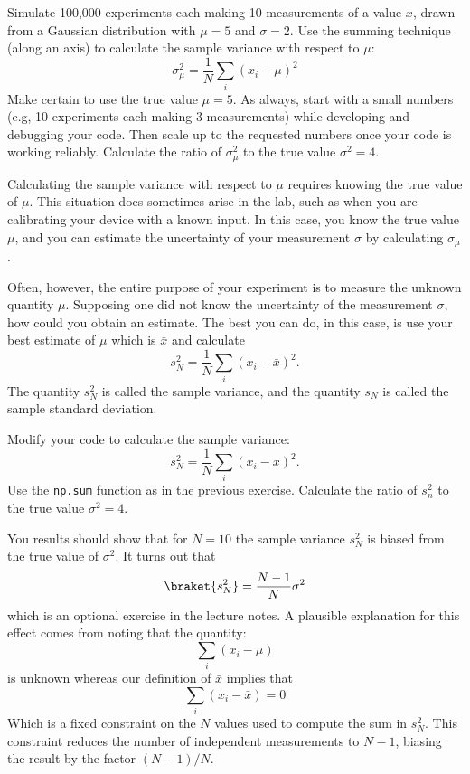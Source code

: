 \begin{plot}\end{plot}
Simulate 100,000 experiments each making 10 measurements of a value
$x$, drawn from a Gaussian distribution with $\mu=5$ and $\sigma=2$.
Use the summing technique (along an axis) to calculate the sample
variance with respect to $\mu$:
\begin{displaymath}
\sigma^2_\mu = \frac{1}{N } \sum_i (x_i -\mu)^2 
\end{displaymath}
Make certain to use the true value $\mu=5$.  As always, start with a
small numbers (e.g, 10 experiments each making 3 measurements) while
developing and debugging your code.  Then scale up to the requested
numbers once your code is working reliably.  Calculate the ratio of
$\sigma^2_\mu$ to the true value $\sigma^2 = 4$.

Calculating the sample variance with respect to $\mu$ requires knowing
the true value of $\mu$.  This situation does sometimes arise in the
lab, such as when you are calibrating your device with a known input.
In this case, you know the true value $\mu$, and you can estimate the
uncertainty of your measurement $\sigma$ by calculating $\sigma_\mu$.

Often, however, the entire purpose of your experiment is to measure
the unknown quantity $\mu$.  Supposing one did not know the
uncertainty of the measurement $\sigma$, how could you obtain an
estimate.  The best you can do, in this case, is use your best
estimate of $\mu$ which is $\bar{x}$ and calculate
\begin{displaymath}
s_N^2  = \frac{1}{N} \sum_i (x_i-\bar{x})^2.
\end{displaymath}
The quantity $s_N^2$ is called the sample variance, and the quantity
$s_N$ is called the sample standard deviation.

\begin{plot}\end{plot}
Modify your code to calculate the sample variance:
\begin{displaymath}
s_N^2  = \frac{1}{N} \sum_i (x_i-\bar{x})^2.
\end{displaymath}
Use the {\tt np.sum} function as in the previous exercise.  Calculate the ratio of $s^2_n$ to the true value $\sigma^2 = 4$.

You results should show that for $N=10$ the sample variance $s^2_N$ is
biased from the true value of $\sigma^2$.  It turns out that
\begin{equation}
\braket{s_N^2} = \frac{N-1}{N} \sigma^2
\end{equation}
which is an optional exercise in the lecture notes.  A plausible
explanation for this effect comes from noting that the quantity:
\begin{displaymath}
\sum_i (x_i - \mu) 
\end{displaymath}
is unknown whereas our definition of $\bar{x}$ implies that
\begin{displaymath}
\sum_i (x_i - \bar{x}) = 0
\end{displaymath}
Which is a fixed constraint on the $N$ values used to compute the sum in
$s_N^2$.  This constraint reduces the number of independent
measurements to $N-1$, biasing the result by the factor $(N-1)/N$.

